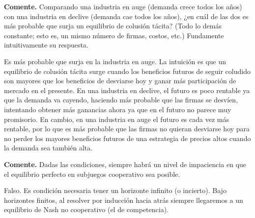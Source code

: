 \begin{parts}
\begin{solution}
\end{solution}
\end{parts}

\question \textbf{Comente.} Comparando una industria en auge (demanda crece todos los años) con una industria en declive (demanda cae todos los años), ¿en cuál de las dos es más probable que surja un equilibrio de colusión tácita? (Todo lo demás constante; esto es, un mismo número de firmas, costos, etc.) Fundamente intuitivamente su respuesta.
\begin{solution}
Es más probable que surja en la industria en auge. La intuición es que un equilibrio de colusión tácita surge cuando los beneficios futuros de seguir coludido son mayores que los beneficios de desviarse hoy y ganar más participación de mercado en el presente. En una industria en declive, el futuro es poco rentable ya que la demanda va cayendo, haciendo más probable que las firmas se desvíen, intentando obtener más ganancias ahora ya que en el futuro no parece muy promisorio. En cambio, en una industria en auge el futuro es cada vez más rentable, por lo que es más probable que las firmas no quieran desviarse hoy para no perder los mayores beneficios futuros de una estrategia de precios altos cuando la demanda sea también alta.

\end{solution}

\question \textbf{Comente.} Dadas las condiciones, siempre habrá un nivel de impaciencia en que el equilibrio perfecto en subjuegos cooperativo sea posible.
\begin{solution}
Falso. Es condición necesaria tener un horizonte infinito (o incierto). Bajo horizontes finitos, al resolver por inducción hacia atrás siempre llegaremos a un equilibrio de Nash no cooperativo (el de competencia).

\end{solution}

